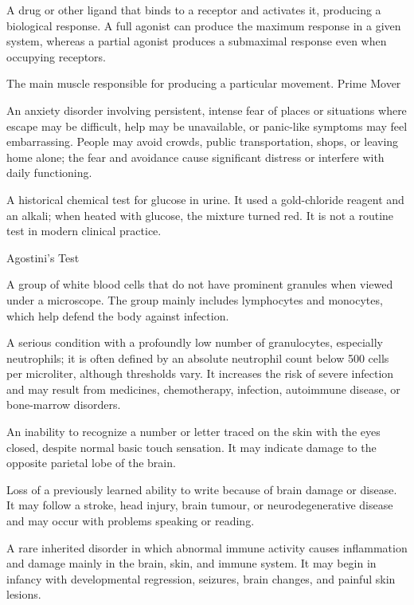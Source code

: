  A drug or other ligand that binds to a receptor and activates it, producing a biological response. A full agonist can produce the maximum response in a given system, whereas a partial agonist produces a submaximal response even when occupying receptors.

 The main muscle responsible for producing a particular movement.
\synonyms
Prime Mover

 An anxiety disorder involving persistent, intense fear of places or situations where escape may be difficult, help may be unavailable, or panic-like symptoms may feel embarrassing. People may avoid crowds, public transportation, shops, or leaving home alone; the fear and avoidance cause significant distress or interfere with daily functioning.

 A historical chemical test for glucose in urine. It used a gold-chloride reagent and an alkali; when heated with glucose, the mixture turned red. It is not a routine test in modern clinical practice.

\synonyms
Agostini's Test

 A group of white blood cells that do not have prominent granules when viewed under a microscope. The group mainly includes lymphocytes and monocytes, which help defend the body against infection.

 A serious condition with a profoundly low number of granulocytes, especially neutrophils; it is often defined by an absolute neutrophil count below 500 cells per microliter, although thresholds vary. It increases the risk of severe infection and may result from medicines, chemotherapy, infection, autoimmune disease, or bone-marrow disorders.

 An inability to recognize a number or letter traced on the skin with the eyes closed, despite normal basic touch sensation. It may indicate damage to the opposite parietal lobe of the brain.

 Loss of a previously learned ability to write because of brain damage or disease. It may follow a stroke, head injury, brain tumour, or neurodegenerative disease and may occur with problems speaking or reading.

 A rare inherited disorder in which abnormal immune activity causes inflammation and damage mainly in the brain, skin, and immune system. It may begin in infancy with developmental regression, seizures, brain changes, and painful skin lesions.

